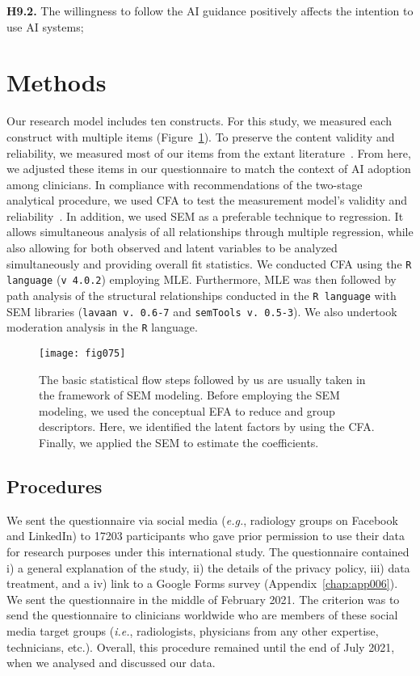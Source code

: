\noindent
{\bf H9.2.} The willingness to follow the \ac{AI} guidance positively affects the intention to use AI systems;

\section{Methods}
\label{sec:chap004004}

Our research model includes ten constructs.
For this study, we measured each construct with multiple items (Figure~\ref{fig:fig075}).
To preserve the content validity and reliability, we measured most of our items from the extant literature~\cite{SOHN2020101324}.
From here, we adjusted these items in our questionnaire to match the context of \ac{AI} adoption among clinicians.
In compliance with recommendations of the two-stage analytical procedure, we used \ac{CFA} to test the measurement model’s validity and reliability~\cite{2019-07124-034}.
In addition, we used \ac{SEM} as a preferable technique to regression.
It allows simultaneous analysis of all relationships through multiple regression, while also allowing for both observed and latent variables to be analyzed simultaneously and providing overall fit statistics.
We conducted \ac{CFA} using the \texttt{R language} (\texttt{v 4.0.2}) employing \ac{MLE}.
Furthermore, \ac{MLE} was then followed by path analysis of the structural relationships conducted in the \texttt{R language} with \ac{SEM} libraries (\texttt{lavaan v. 0.6-7} and \texttt{semTools v. 0.5-3}).
We also undertook moderation analysis in the \texttt{R} language.

\begin{figure}[htpb]
\centering
\texttt{[image: fig075]}
\caption{The basic statistical flow steps followed by us are usually taken in the framework of SEM modeling. Before employing the SEM modeling, we used the conceptual EFA to reduce and group descriptors. Here, we identified the latent factors by using the CFA. Finally, we applied the SEM to estimate the coefficients.}
\label{fig:fig075}
\end{figure}

\subsection{Procedures}
\label{sec:chap004004001}

We sent the questionnaire via social media ({\it e.g.}, radiology groups on Facebook and LinkedIn) to 17203 participants who gave prior permission to use their data for research purposes under this international study.
The questionnaire contained i) a general explanation of the study, ii) the details of the privacy policy, iii) data treatment, and a iv) link to a Google Forms survey (Appendix~\ref{chap:app006}).
We sent the questionnaire in the middle of February 2021.
The criterion was to send the questionnaire to clinicians worldwide who are members of these social media target groups ({\it i.e.}, radiologists, physicians from any other expertise, technicians, etc.).
Overall, this procedure remained until the end of July 2021, when we analysed and discussed our data.


